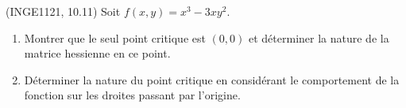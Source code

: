
\begin{exercice}\label{exoMaximisation-0000}

	(INGE1121, 10.11) Soit $f(x,y)=x^3-3xy^2$.
	\begin{enumerate}

		\item
			Montrer que le seul point critique est $(0,0)$ et déterminer la nature de la matrice hessienne en ce point.
		\item
			Déterminer la nature du point critique en considérant le comportement de la fonction sur les droites passant par l'origine.

	\end{enumerate}

\end{exercice}
